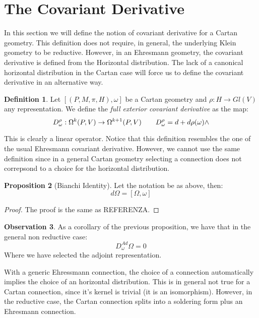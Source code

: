 \documentclass[12pt,a4paper]{report}
\theoremstyle{definition}
\newtheorem{Def}{Definition}[chapter]
\theoremstyle{Theorem}
\newtheorem{Prop}[Def]{Proposition}
\theoremstyle{definition}
\theoremstyle{definition}
\newtheorem{Obs}[Def]{Observation}
\begin{document}
	\section{The Covariant Derivative}
	In this section we will define the notion of covariant derivative for a Cartan geometry. This definition does not require, in general, the underlying Klein geometry to be reductive. However, in an Ehresmann geometry, the covariant derivative is defined from the Horizontal distribution. The lack of a canonical horizontal distribution in the Cartan case will force us to define the covariant derivative in an alternative way.
	\begin{Def}
		Let $[(P,M,\pi,H),\omega]$ be a Cartan geometry and $\rho:H\rightarrow Gl(V)$ any representation. We define the \textit{full exterior covariant derivative} as the map:
		$$D_\omega^\rho:\Omega^k(P,V)\rightarrow \Omega^{k+1}(P,V)\hspace{20 pt}D_\omega^\rho=d+d\rho(\omega)\wedge$$
	\end{Def}
	This is clearly a linear operator.
	Notice that this definition resembles the one of the usual Ehresmann covariant derivative. However, we cannot use the same definition since in a general Cartan geometry selecting a connection does not correpsond to a choice for the horizontal distribution.
	\begin{Prop}[Bianchi Identity]
		Let the notation be as above, then:
		$$d\Omega=[\Omega,\omega]$$
	\end{Prop}
	\begin{proof}
		The proof is the same as REFERENZA.
	\end{proof}
	\begin{Obs}
		As a corollary of the previous proposition, we have that in the general non reductive case:
		$$D_\omega^{Ad}\Omega=0$$
		Where we have selected the adjoint representation.
	\end{Obs}
	With a generic Ehressmann connection, the choice of a connection automatically implies the choice of an horizontal distribution. This is in general not true for a Cartan connection, since it's kernel is trivial (it is an isomorphism). However, in the reductive case, the Cartan connection splits into a soldering form plus an Ehresmann connection.
\end{document}
